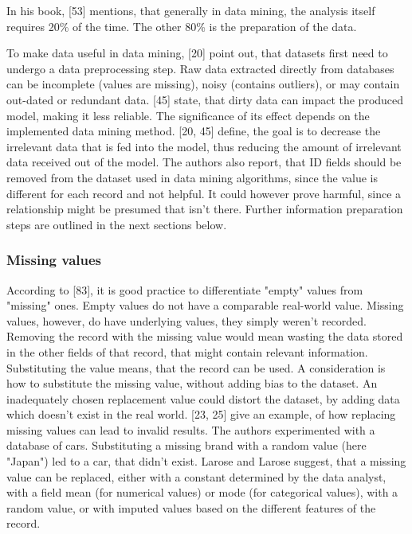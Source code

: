 In his book, \textcite{mccue2014data}[53] mentions, that generally in data mining, the analysis itself requires 20\% of the time. The other 80\% is the preparation of the data.

To make data useful in data mining, \textcite{DataMiningAndPredictiveAnalytics}[20] point out, that datasets first need to undergo a data preprocessing step. Raw data extracted directly from databases can be incomplete (values are missing), noisy (contains outliers), or may contain out-dated or redundant data. \textcite{dataPreprocessingInDataMining}[45] state, that dirty data can impact the produced model, making it less reliable. The significance of its effect depends on the implemented data mining method. \textcite{DataMiningAndPredictiveAnalytics}[20, 45] define, the goal is to decrease the irrelevant data that is fed into the model, thus reducing the amount of irrelevant data received out of the model. The authors also report, that ID fields should be removed from the dataset used in data mining algorithms, since the value is different for each record and not helpful. It could however prove harmful, since a relationship might be presumed that isn't there. Further information preparation steps are outlined in the next sections below.



\subsubsection{Missing values}
\label{section:MissingValues}

According to \textcite{dataPreparationForDataMining}[83], it is good practice to differentiate "empty" values from "missing" ones. Empty values do not have a comparable real-world value. Missing values, however, do have underlying values, they simply weren't recorded. Removing the record with the missing value would mean wasting the data stored in the other fields of that record, that might contain relevant information. Substituting the value means, that the record can be used. A consideration is how to substitute the missing value, without adding bias to the dataset. An inadequately chosen replacement value could distort the dataset, by adding data which doesn't exist in the real world. \textcite{DataMiningAndPredictiveAnalytics}[23, 25] give an example, of how replacing missing values can lead to invalid results. The authors experimented with a database of cars. Substituting a missing brand with a random value (here "Japan") led to a car, that didn't exist. Larose and Larose suggest, that a missing value can be replaced, either with a constant determined by the data analyst, with a field mean (for numerical values) or mode (for categorical values), with a random value, or with imputed values based on the different features of the record.  


